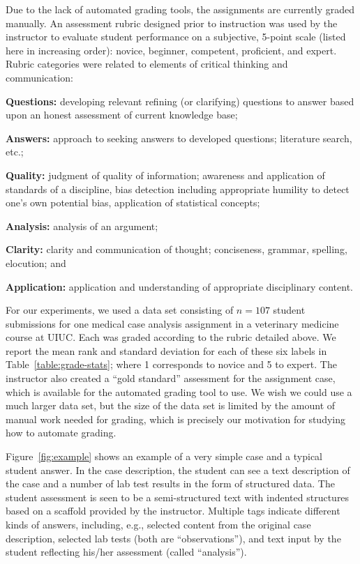 Due to the lack of automated grading tools, the assignments are currently
graded manually. An assessment rubric designed prior to instruction was
used by the instructor to evaluate student performance on a subjective,
5-point scale (listed here in increasing order): novice, beginner,
competent, proficient, and expert. Rubric categories were related to
elements of critical thinking and communication:
\begin{enumerate*}[label=\itshape(\arabic*)\upshape]
\item {\bf Questions:} developing relevant refining (or clarifying)
 questions to answer based upon an honest assessment of current knowledge
 base;
\item {\bf Answers:} approach to seeking answers to developed
 questions; literature search, etc.;
\item {\bf Quality:} judgment of quality of information; awareness and
 application of standards of a discipline, bias detection including
 appropriate humility to detect one’s own potential bias, application of
 statistical concepts;
\item {\bf Analysis:} analysis of an argument;
\item  {\bf Clarity:} clarity and communication of thought; conciseness,
 grammar, spelling, elocution; and
\item {\bf Application:} application and understanding of appropriate
 disciplinary content.
\end{enumerate*}



For our experiments, we used a data set consisting of $n = 107$ student
submissions for one medical case analysis assignment in a veterinary
medicine course at UIUC\@. Each was graded according to the rubric detailed
above.  We report the mean rank and standard deviation for each of these
six labels in Table~\ref{table:grade-stats}; where 1 corresponds to novice
and 5 to expert. The instructor also created a ``gold standard'' assessment
for the assignment case, which is available for the automated grading tool
to use.  We wish we could use a much larger data set, but the size of the
data set is limited by the amount of manual work needed for grading, which
is precisely our motivation for studying how to automate grading.

Figure~\ref{fig:example} shows an example of a very simple case and a typical
student answer. In the case description, the student can see a text
description of the case and a number of lab test results in the form of
structured data. The student assessment is seen to be a semi-structured
text with indented structures based on a scaffold provided by the
instructor. Multiple tags indicate different kinds of answers, including,
e.g., selected content from the original case description, selected lab
tests (both are ``observations''), and text input by the student reflecting
his/her assessment (called ``analysis'').

